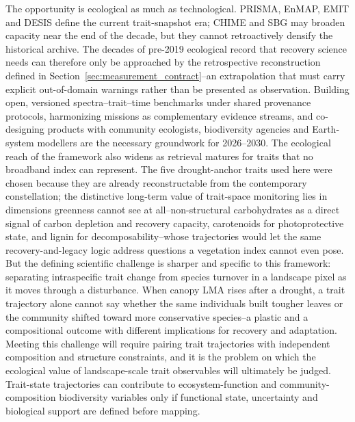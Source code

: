 \documentclass[pdflatex,sn-mathphys-num]{sn-jnl}
\begin{document}
The opportunity is ecological as much as technological. PRISMA, EnMAP, EMIT and DESIS define the current trait-snapshot era; CHIME and SBG may broaden capacity near the end of the decade, but they cannot retroactively densify the historical archive. The decades of pre-2019 ecological record that recovery science needs can therefore only be approached by the retrospective reconstruction defined in Section~\ref{sec:measurement_contract}--an extrapolation that must carry explicit out-of-domain warnings rather than be presented as observation. Building open, versioned spectra--trait--time benchmarks under shared provenance protocols, harmonizing missions as complementary evidence streams, and co-designing products with community ecologists, biodiversity agencies and Earth-system modellers are the necessary groundwork for 2026--2030. The ecological reach of the framework also widens as retrieval matures for traits that no broadband index can represent. The five drought-anchor traits used here were chosen because they are already reconstructable from the contemporary constellation; the distinctive long-term value of trait-space monitoring lies in dimensions greenness cannot see at all--non-structural carbohydrates as a direct signal of carbon depletion and recovery capacity, carotenoids for photoprotective state, and lignin for decomposability--whose trajectories would let the same recovery-and-legacy logic address questions a vegetation index cannot even pose. But the defining scientific challenge is sharper and specific to this framework: separating intraspecific trait change from species turnover in a landscape pixel as it moves through a disturbance. When canopy LMA rises after a drought, a trait trajectory alone cannot say whether the same individuals built tougher leaves or the community shifted toward more conservative species--a plastic and a compositional outcome with different implications for recovery and adaptation. Meeting this challenge will require pairing trait trajectories with independent composition and structure constraints, and it is the problem on which the ecological value of landscape-scale trait observables will ultimately be judged. Trait-state trajectories can contribute to ecosystem-function and community-composition biodiversity variables \cite{pereira2013ebv,kissling2018traits} only if functional state, uncertainty and biological support are defined before mapping.
\end{document}
